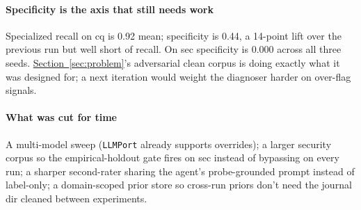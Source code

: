 \documentclass[11pt,a4paper]{article}
\newcommand{\secref}[1]{\hyperref[#1]{Section~\ref*{#1}}}
\begin{document}
\paragraph{Specificity is the axis that still needs work} Specialized recall on cq is 0.92 mean; specificity is 0.44, a 14-point lift over the previous run but well short of recall. On sec specificity is 0.000 across all three seeds. \secref{sec:problem}'s adversarial clean corpus is doing exactly what it was designed for; a next iteration would weight the diagnoser harder on over-flag signals.

\paragraph{What was cut for time} A multi-model sweep (\texttt{LLMPort} already supports overrides); a larger security corpus so the empirical-holdout gate fires on sec instead of bypassing on every run; a sharper second-rater sharing the agent's probe-grounded prompt instead of label-only; a domain-scoped prior store so cross-run priors don't need the journal dir cleaned between experiments.
\end{document}
